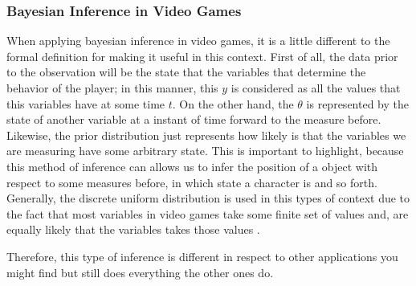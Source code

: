 \subsubsection{Bayesian Inference in Video Games}
When applying bayesian inference in video games, it is a little different to the formal definition for making it useful in this context. First of all, the data prior to the observation will be the state that the variables that determine the behavior of the player; in this manner, this $y$ is considered as all the values that this variables have at some time $t$. On the other hand, the $\theta$ is represented by the state of another variable at a instant of time forward to the measure before. Likewise, the prior distribution just represents how likely is that the variables we are measuring have some arbitrary state. This is important to highlight, because this method of inference can allows us to infer the position of a object with respect to some measures before, in which state a character is and so forth. Generally, the discrete uniform distribution is used in this types of context due to the fact that most variables in video games take some finite set of values and, are equally likely that the variables takes those values \cite{coue2003using}.

Therefore, this type of inference is different in respect to other applications you might find but still does everything the other ones do.
